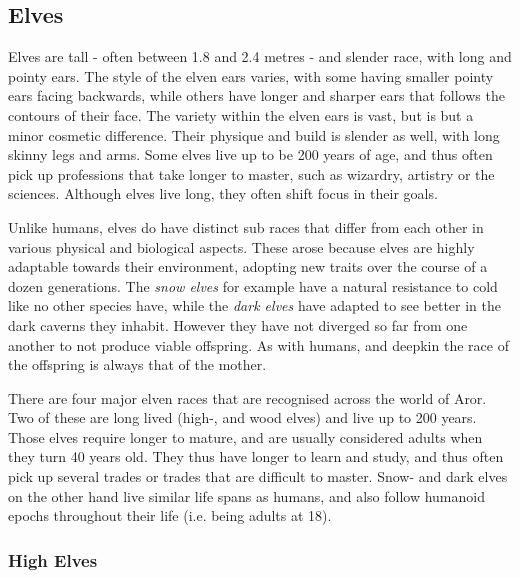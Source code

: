 \subsection{Elves}
\label{sec:Elves}

Elves are tall - often between 1.8 and 2.4 metres - and slender race, with
long and pointy ears. The style of the elven ears varies, with some having
smaller pointy ears facing backwards, while others have longer and sharper
ears that follows the contours of their face. The variety within the elven
ears is vast, but is but a minor cosmetic difference. Their physique and build
is slender as well, with long skinny legs and arms. Some elves live up to be
200 years of age, and thus often pick up professions that take longer to
master, such as wizardry, artistry or the sciences. Although elves live long,
they often shift focus in their goals.

Unlike humans, elves do have distinct sub races that differ from each other in
various physical and biological aspects. These arose because elves are highly
adaptable towards their environment, adopting new traits over the course of a
dozen generations. The \emph{snow elves} for example have a natural resistance
to cold like no other species have, while the \emph{dark elves} have adapted
to see better in the dark caverns they inhabit. However they have not diverged
so far from one another to not produce viable offspring. As with humans, and
deepkin the race of the offspring is always that of the mother.



There are four major elven races that are recognised across the world of Aror.
Two of these are long lived (high-, and wood elves) and live up to 200
years. Those elves require longer to mature, and are usually considered adults
when they turn 40 years old. They thus have longer to learn and study, and
thus often pick up several trades or trades that are difficult to master.
Snow- and dark elves on the other hand live similar life spans as humans, and
also follow humanoid epochs throughout their life (i.e. being adults at 18).

\subsubsection{High Elves}
\label{sec:High Elves}

